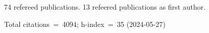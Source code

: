 74 refereed publications. 13 refeered publications as first author.

Total citations~=~4094; h-index~=~35 (2024-05-27)